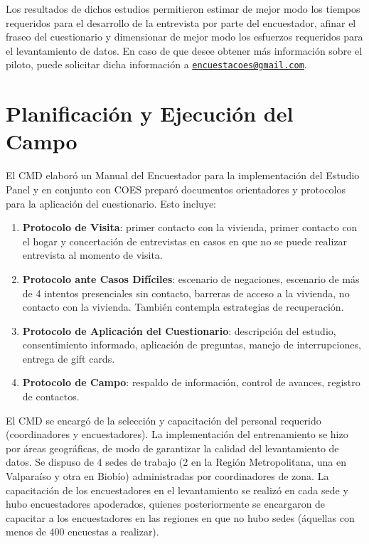 \documentclass[
]{book}
\begin{document}
Los resultados de dichos estudios permitieron estimar de mejor modo los
tiempos requeridos para el desarrollo de la entrevista por parte del
encuestador, afinar el fraseo del cuestionario y dimensionar de mejor
modo los esfuerzos requeridos para el levantamiento de datos. En caso de
que desee obtener más información sobre el piloto, puede solicitar dicha
información a
\href{mailto:encuestacoes@gmail.com}{\nolinkurl{encuestacoes@gmail.com}}.

\hypertarget{planificaciuxf3n-y-ejecuciuxf3n-del-campo}{%
\section{Planificación y Ejecución del
Campo}\label{planificaciuxf3n-y-ejecuciuxf3n-del-campo}}

El CMD elaboró un Manual del Encuestador para la implementación del
Estudio Panel y en conjunto con COES preparó documentos orientadores y
protocolos para la aplicación del cuestionario. Esto incluye:

\begin{enumerate}
\def\labelenumi{\arabic{enumi}.}
\item
  \textbf{Protocolo de Visita}: primer contacto con la vivienda, primer
  contacto con el hogar y concertación de entrevistas en casos en que no
  se puede realizar entrevista al momento de visita.
\item
  \textbf{Protocolo ante Casos Difíciles}: escenario de negaciones,
  escenario de más de 4 intentos presenciales sin contacto, barreras de
  acceso a la vivienda, no contacto con la vivienda. También contempla
  estrategias de recuperación.
\item
  \textbf{Protocolo de Aplicación del Cuestionario}: descripción del
  estudio, consentimiento informado, aplicación de preguntas, manejo de
  interrupciones, entrega de gift cards.
\item
  \textbf{Protocolo de Campo}: respaldo de información, control de
  avances, registro de contactos.
\end{enumerate}

El CMD se encargó de la selección y capacitación del personal requerido
(coordinadores y encuestadores). La implementación del entrenamiento se
hizo por áreas geográficas, de modo de garantizar la calidad del
levantamiento de datos. Se dispuso de 4 sedes de trabajo (2 en la Región
Metropolitana, una en Valparaíso y otra en Biobío) administradas por
coordinadores de zona. La capacitación de los encuestadores en el
levantamiento se realizó en cada sede y hubo encuestadores apoderados,
quienes posteriormente se encargaron de capacitar a los encuestadores en
las regiones en que no hubo sedes (áquellas con menos de 400 encuestas a
realizar).
\end{document}
